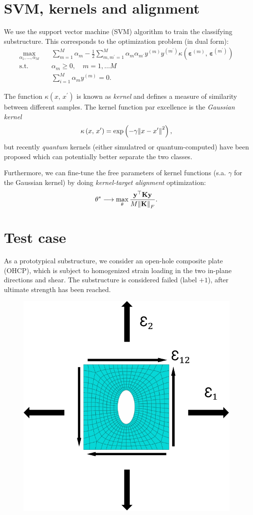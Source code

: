 \documentclass[9pt,a4paper]{extarticle}
\begin{document}
\begin{multicols}{2}
\section{SVM, kernels and alignment}
We use the support vector machine (SVM) algorithm to train the classifying substructure. This corresponds to the optimization problem (in dual form):
\begin{displaymath}
    \begin{aligned}
      \max_{\alpha_1,\dots, \alpha_M} \quad & \sum_{m=1}^{M}\alpha_m - \frac{1}{2}\sum_{m,m^\prime=1}^{M}\alpha_m\alpha_{m^\prime}y^{(m)}y^{(m^\prime)}\kappa\left( \bm{\varepsilon}^{(m)},\, \bm{\varepsilon}^{(m^\prime)} \right) \\
      \mathrm{s.t.}\quad & \alpha_m \geq 0,\quad m=1,\dots M \\
      & \sum_{i=1}^M \alpha_m y^{(m)} = 0.
    \end{aligned}
\end{displaymath}

The function $\kappa\left(x,\, x^\prime\right)$ is known as \emph{kernel} and defines a measure of similarity between different samples. The kernel function par excellence is the \emph{Gaussian kernel} 
\[\kappa\left(x,\, x^\prime\right) = \exp\left( -\gamma \norm{x - x^\prime}^2 \right),\]
but recently \emph{quantum} kernels \cite{Havlicek} (either simulatred or quantum-computed) have been proposed which can potentially better separate the two classes.

Furthermore, we can fine-tune the free parameters of kernel functions (s.a. $\gamma$ for the Gaussian kernel) by doing \emph{kernel-target alignment} optimization:
\[
    \theta^* \longrightarrow \max_\theta \frac{\mathbf{y}^\top \mathbf{K} \mathbf{y}}{M \norm{\mathbf{K}}_F}.
\]


\section{Test case}
As a prototypical substructure, we consider an open-hole composite plate (OHCP), which is subject to homogenized strain loading in the two in-plane directions and shear. The substructure is considered failed (label $+1$), after ultimate strength has been reached.
\begin{figure}[H]
    \centering
    \includegraphics[width=.3\textwidth]{pics/ohcp-geom-loads.pdf}
\end{figure}


\end{multicols}
\end{document}
